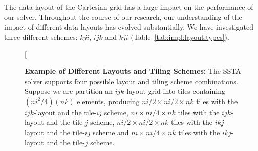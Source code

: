 \documentclass[10pt, conference, compsocconf]{IEEEtran}
\begin{document}
The data layout of the Cartesian grid has a huge impact on the performance
  of our solver.
Throughout the course of our research, our understanding of the impact of
  different data layouts has evolved substantially.
We have investigated three different schemes: \(kji\), \(ijk\) and \(kji\)
  (Table~\ref{tab:impl:layout:types}).

\begin{figure}[!bth]
  \centering
  \caption{\small
    \textbf{Example of Different Layouts and Tiling Schemes:}
      The SSTA solver supports four possible layout and tiling scheme combinations.
      Suppose we are partition an \(ijk\)-layout grid into tiles containing
        \((ni^2/4)(nk)\) elements, producing 
        \(ni/2 \times ni/2 \times nk\) tiles with the \(ijk\)-layout and the
          tile-\(ij\) scheme,
        \(ni \times ni/4 \times nk\) tiles with the \(ijk\)-layout and the
          tile-\(j\) scheme,
        \(ni/2 \times ni/2 \times nk\) tiles with the \(ikj\)-layout and the
          tile-\(ij\) scheme and
        \(ni \times ni/4 \times nk\) tiles with the \(ikj\)-layout and the
          tile-\(j\) scheme.
  }
  \label{fig:impl:tiling_schemes}
  \begin{minipage}{0.49\textwidth}
    \centering
  \end{minipage}
  \begin{minipage}{0.49\textwidth}
    \centering
    \subfloat[

\end{minipage}
\end{figure}
\end{document}
